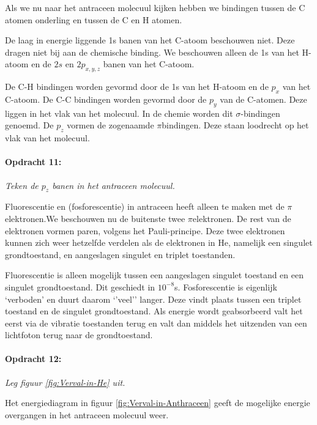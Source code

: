 Als we nu naar het antraceen molecuul kijken hebben we bindingen tussen
de C atomen onderling en tussen de C en H atomen.

De laag in energie liggende 1s banen van het C-atoom beschouwen niet.
Deze dragen niet bij aan de chemische binding. We beschouwen alleen
de 1s van het H-atoom en de $2s$ en $2p_{x,y,z}$ banen van het C-atoom.

De C-H bindingen worden gevormd door de 1s van het H-atoom en de $p_{x}$
van het C-atoom. De C-C bindingen worden gevormd door de $p_{y}$
van de C-atomen. Deze liggen in het vlak van het molecuul. In de chemie
worden dit $\sigma$-bindingen genoemd. De $p_{z}$ vormen de zogenaamde
$\pi$\textendash{}bindingen. Deze staan loodrecht op het vlak van
het molecuul.


\paragraph*{Opdracht 11:}

\emph{Teken de $p_{z}$ banen in het antraceen molecuul.}

Fluorescentie en (fosforescentie) in antraceen heeft alleen te maken
met de $\pi$\textendash{}elektronen.We beschouwen nu de buitenste
twee $\pi$\textendash{}elektronen. De rest van de elektronen vormen
paren, volgens het Pauli-principe. Deze twee elektronen kunnen zich
weer hetzelfde verdelen als de elektronen in He, namelijk een singulet
grondtoestand, en aangeslagen singulet en triplet toestanden.

Fluorescentie is alleen mogelijk tussen een aangeslagen singulet toestand
en een singulet grondtoestand. Dit geschiedt in $10^{-8}$s. Fosforescentie
is eigenlijk \textquoteleft{}verboden\textquoteright{} en duurt daarom
\textquoteleft{}\textquoteright{}veel\textquoteright{}\textquoteright{}
langer. Deze vindt plaats tussen een triplet toestand en de singulet
grondtoestand. Als energie wordt geabsorbeerd valt het eerst via de
vibratie toestanden terug en valt dan middels het uitzenden van een
lichtfoton terug naar de grondtoestand.


\paragraph*{Opdracht 12:}

\emph{Leg figuur \ref{fig:Verval-in-He} uit.}

Het energiediagram in figuur \ref{fig:Verval-in-Anthraceen} geeft
de mogelijke energie overgangen in het antraceen molecuul weer.

